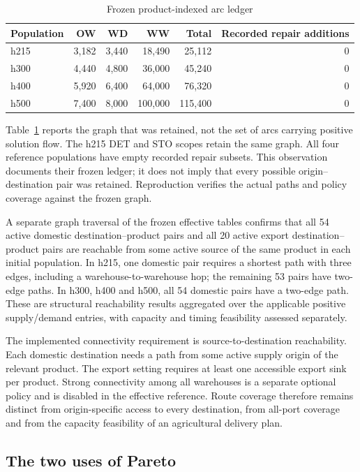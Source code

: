 \documentclass[11pt,a4paper]{article}
\begin{document}
\begin{table}[H]\centering\small
\caption{Frozen product-indexed arc ledger}\label{tab:arcledger}
\begin{tabular}{lrrrrr}\toprule
Population&OW&WD&WW&Total&Recorded repair additions\\\midrule
h215&3,182&3,440&18,490&25,112&0\\
h300&4,440&4,800&36,000&45,240&0\\
h400&5,920&6,400&64,000&76,320&0\\
h500&7,400&8,000&100,000&115,400&0\\\bottomrule
\end{tabular}
\end{table}

Table~\ref{tab:arcledger} reports the graph that was retained, not the set of arcs carrying positive solution flow. The h215 DET and STO scopes retain the same graph. All four reference populations have empty recorded repair subsets. This observation documents their frozen ledger; it does not imply that every possible origin--destination pair was retained. Reproduction verifies the actual paths and policy coverage against the frozen graph.

A separate graph traversal of the frozen effective tables confirms that all 54 active domestic destination--product pairs and all 20 active export destination--product pairs are reachable from some active source of the same product in each initial population. In h215, one domestic pair requires a shortest path with three edges, including a warehouse-to-warehouse hop; the remaining 53 pairs have two-edge paths. In h300, h400 and h500, all 54 domestic pairs have a two-edge path. These are structural reachability results aggregated over the applicable positive supply/demand entries, with capacity and timing feasibility assessed separately.

The implemented connectivity requirement is source-to-destination reachability. Each domestic destination needs a path from some active supply origin of the relevant product. The export setting requires at least one accessible export sink per product. Strong connectivity among all warehouses is a separate optional policy and is disabled in the effective reference. Route coverage therefore remains distinct from origin-specific access to every destination, from all-port coverage and from the capacity feasibility of an agricultural delivery plan.

\subsection{The two uses of Pareto}
\end{document}
